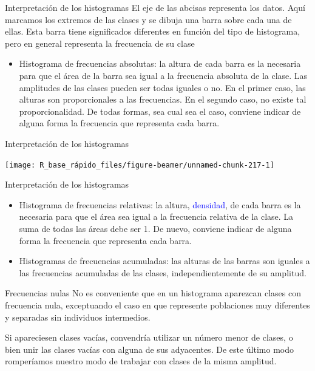 \documentclass[
  ignorenonframetext,
  aspectratio=169]{beamer}
\providecommand{\tightlist}{%
  \setlength{\itemsep}{0pt}\setlength{\parskip}{0pt}}
\newcommand\blue[1]{\textcolor{blue}{#1}}
\begin{document}
\begin{frame}{Interpretación de los histogramas}
\label{interpretaciuxf3n-de-los-histogramas}
El eje de las abcisas representa los datos. Aquí marcamos los extremos
de las clases y se dibuja una barra sobre cada una de ellas. Esta barra
tiene significados diferentes en función del tipo de histograma, pero en
general representa la frecuencia de su clase

\begin{itemize}
\tightlist
\item
  Histograma de frecuencias absolutas: la altura de cada barra es la
  necesaria para que el área de la barra sea igual a la frecuencia
  absoluta de la clase. Las amplitudes de las clases pueden ser todas
  iguales o no. En el primer caso, las alturas son proporcionales a las
  frecuencias. En el segundo caso, no existe tal proporcionalidad. De
  todas formas, sea cual sea el caso, conviene indicar de alguna forma
  la frecuencia que representa cada barra.
\end{itemize}
\end{frame}

\begin{frame}{Interpretación de los histogramas}
\label{interpretaciuxf3n-de-los-histogramas-1}
\begin{center}\texttt{[image: R\_base\_rápido\_files/figure-beamer/unnamed-chunk-217-1]} \end{center}
\end{frame}

\begin{frame}{Interpretación de los histogramas}
\label{interpretaciuxf3n-de-los-histogramas-2}
\begin{itemize}
\tightlist
\item
  Histograma de frecuencias relativas: la altura, \blue{densidad}, de
  cada barra es la necesaria para que el área sea igual a la frecuencia
  relativa de la clase. La suma de todas las áreas debe ser 1. De nuevo,
  conviene indicar de alguna forma la frecuencia que representa cada
  barra.
\item
  Histogramas de frecuencias acumuladas: las alturas de las barras son
  iguales a las frecuencias acumuladas de las clases, independientemente
  de su amplitud.
\end{itemize}
\end{frame}

\begin{frame}{Frecuencias nulas}
\label{frecuencias-nulas}
No es conveniente que en un histograma aparezcan clases con frecuencia
nula, exceptuando el caso en que represente poblaciones muy diferentes y
separadas sin individuos intermedios.

Si apareciesen clases vacías, convendría utilizar un número menor de
clases, o bien unir las clases vacías con alguna de sus adyacentes. De
este último modo romperíamos nuestro modo de trabajar con clases de la
misma amplitud.
\end{frame}
\end{document}
